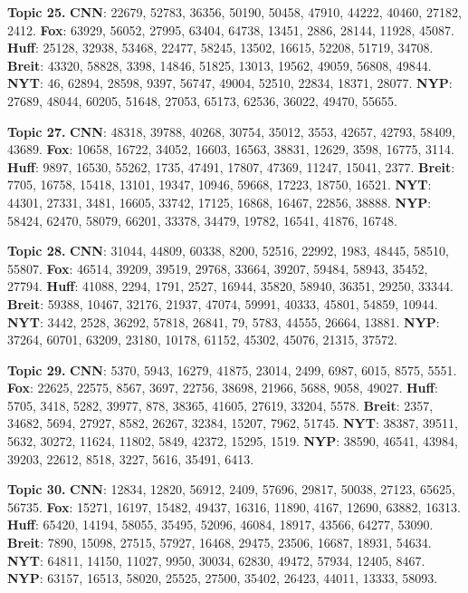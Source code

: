 \documentclass[11pt]{article}
\begin{document}
\textbf{Topic 25.}
\textbf{CNN}: 22679, 52783, 36356, 50190, 50458, 47910, 44222, 40460, 27182, 2412.
\textbf{Fox}: 63929, 56052, 27995, 63404, 64738, 13451, 2886, 28144, 11928, 45087.
\textbf{Huff}: 25128, 32938, 53468, 22477, 58245, 13502, 16615, 52208, 51719, 34708.
\textbf{Breit}: 43320, 58828, 3398, 14846, 51825, 13013, 19562, 49059, 56808, 49844.
\textbf{NYT}: 46, 62894, 28598, 9397, 56747, 49004, 52510, 22834, 18371, 28077.
\textbf{NYP}: 27689, 48044, 60205, 51648, 27053, 65173, 62536, 36022, 49470, 55655.




\textbf{Topic 27.}
\textbf{CNN}: 48318, 39788, 40268, 30754, 35012, 3553, 42657, 42793, 58409, 43689.
\textbf{Fox}: 10658, 16722, 34052, 16603, 16563, 38831, 12629, 3598, 16775, 3114.
\textbf{Huff}: 9897, 16530, 55262, 1735, 47491, 17807, 47369, 11247, 15041, 2377.
\textbf{Breit}: 7705, 16758, 15418, 13101, 19347, 10946, 59668, 17223, 18750, 16521.
\textbf{NYT}: 44301, 27331, 3481, 16605, 33742, 17125, 16868, 16467, 22856, 38888.
\textbf{NYP}: 58424, 62470, 58079, 66201, 33378, 34479, 19782, 16541, 41876, 16748.




\textbf{Topic 28.}
\textbf{CNN}: 31044, 44809, 60338, 8200, 52516, 22992, 1983, 48445, 58510, 55807.
\textbf{Fox}: 46514, 39209, 39519, 29768, 33664, 39207, 59484, 58943, 35452, 27794.
\textbf{Huff}: 41088, 2294, 1791, 2527, 16944, 35820, 58940, 36351, 29250, 33344.
\textbf{Breit}: 59388, 10467, 32176, 21937, 47074, 59991, 40333, 45801, 54859, 10944.
\textbf{NYT}: 3442, 2528, 36292, 57818, 26841, 79, 5783, 44555, 26664, 13881.
\textbf{NYP}: 37264, 60701, 63209, 23180, 10178, 61152, 45302, 45076, 21315, 37572.




\textbf{Topic 29.}
\textbf{CNN}: 5370, 5943, 16279, 41875, 23014, 2499, 6987, 6015, 8575, 5551.
\textbf{Fox}: 22625, 22575, 8567, 3697, 22756, 38698, 21966, 5688, 9058, 49027.
\textbf{Huff}: 5705, 3418, 5282, 39977, 878, 38365, 41605, 27619, 33204, 5578.
\textbf{Breit}: 2357, 34682, 5694, 27927, 8582, 26267, 32384, 15207, 7962, 51745.
\textbf{NYT}: 38387, 39511, 5632, 30272, 11624, 11802, 5849, 42372, 15295, 1519.
\textbf{NYP}: 38590, 46541, 43984, 39203, 22612, 8518, 3227, 5616, 35491, 6413.


\textbf{Topic 30.}
\textbf{CNN}: 12834, 12820, 56912, 2409, 57696, 29817, 50038, 27123, 65625, 56735.
\textbf{Fox}: 15271, 16197, 15482, 49437, 16316, 11890, 4167, 12690, 63882, 16313.
\textbf{Huff}: 65420, 14194, 58055, 35495, 52096, 46084, 18917, 43566, 64277, 53090.
\textbf{Breit}: 7890, 15098, 27515, 57927, 16468, 29475, 23506, 16687, 18931, 54634.
\textbf{NYT}: 64811, 14150, 11027, 9950, 30034, 62830, 49472, 57934, 12405, 8467.
\textbf{NYP}: 63157, 16513, 58020, 25525, 27500, 35402, 26423, 44011, 13333, 58093.
\end{document}
